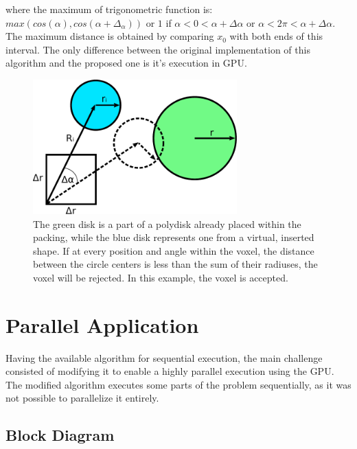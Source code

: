 \documentclass[12pt, oneside]{report}
\begin{document}
\begin{equation*}
[x + R_i \cdot \min_{f_{\alpha} \in [0,1)} cos(\alpha_i + f_{\alpha} \cdot \Delta \alpha), x + \Delta r + R_i \cdot \max_{f_{\alpha} \in [0,1)} cos(\alpha_i + f_{\alpha} \cdot \Delta \alpha)]
\end{equation*}
where the maximum of trigonometric function is: $max (cos(\alpha), cos(\alpha + \Delta_{\alpha})) $ or
$1$ if $ \alpha<0<\alpha + \Delta \alpha $ or $ \alpha< 2 \pi <\alpha + \Delta \alpha$.
The maximum distance is obtained by comparing $x_0$ with both ends of this interval. \newline
The only difference between the original implementation of this algorithm and the proposed one is it's execution in GPU.

\begin{figure}[H]
  \centering
	\label{CieslaAlgorithmDemo}
	\includegraphics[width=0.7\textwidth,keepaspectratio]{Images/CieslaAlgorithm/drawing.pdf}
	\caption{The green disk is a part of a polydisk already placed within the packing, while the blue disk represents one from a virtual, inserted shape. If at every position and angle within the voxel, the distance between the circle centers is less than the sum of their radiuses, the voxel will be rejected. In this example, the voxel is accepted.}
\end{figure}

\section {Parallel Application}

Having the available algorithm for sequential execution, the main challenge consisted of modifying it to enable a highly parallel execution using the GPU. The modified algorithm executes some parts of the problem sequentially, as it was not possible to parallelize it entirely.

\subsection{Block Diagram}
\end{document}
